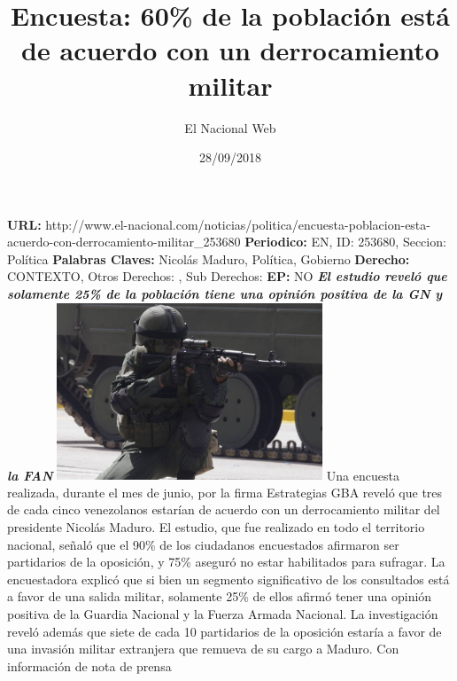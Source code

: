 \documentclass{article}%
\title{\textbf{Encuesta: 60\% de la población está de acuerdo con un derrocamiento militar}}%
\author{El Nacional Web}%
\date{28/09/2018}%
\begin{document}
%
\normalsize%
\maketitle%
\textbf{URL: }%
http://www.el{-}nacional.com/noticias/politica/encuesta{-}poblacion{-}esta{-}acuerdo{-}con{-}derrocamiento{-}militar\_253680\newline%
%
\textbf{Periodico: }%
EN, %
ID: %
253680, %
Seccion: %
Política\newline%
%
\textbf{Palabras Claves: }%
Nicolás Maduro, Política, Gobierno\newline%
%
\textbf{Derecho: }%
CONTEXTO, %
Otros Derechos: %
, %
Sub Derechos: %
\newline%
%
\textbf{EP: }%
NO\newline%
\newline%
%
\textbf{\textit{El estudio reveló que solamente 25\% de la población tiene una opinión positiva de la GN y la FAN}}%
\newline%
\newline%
%
\includegraphics[width=300px]{132.jpg}%
\newline%
%
Una encuesta realizada, durante el mes de junio, por la firma Estrategias GBA reveló que tres de cada cinco venezolanos estarían de acuerdo con un derrocamiento militar del presidente Nicolás Maduro.%
\newline%
%
El estudio, que fue realizado en todo el territorio nacional, señaló que el 90\% de los ciudadanos encuestados afirmaron ser partidarios de la oposición, y 75\% aseguró no estar habilitados para sufragar.%
\newline%
%
La encuestadora explicó que si bien un segmento significativo de los consultados está a favor de una salida militar, solamente 25\% de ellos afirmó tener una opinión positiva de la Guardia Nacional y la Fuerza Armada Nacional.%
\newline%
%
La investigación reveló además que siete de cada 10 partidarios de la oposición estaría a favor de una invasión militar extranjera que remueva de su cargo a Maduro.%
\newline%
%
Con información de nota de prensa%
\newline%
%
\end{document}
